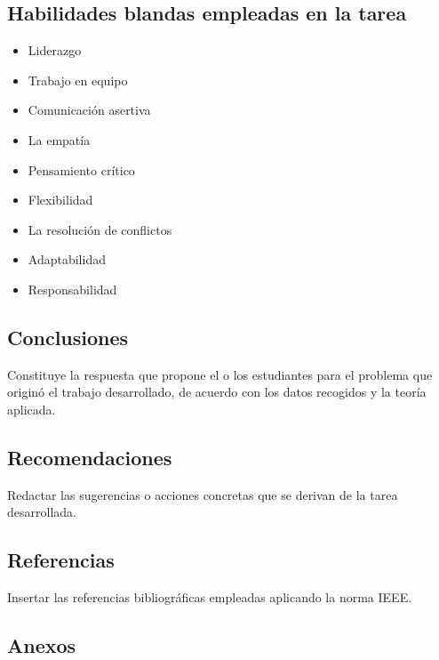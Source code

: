 \documentclass{article}
\begin{document}
\subsection{Habilidades blandas empleadas en la tarea}
\begin{itemize}
    \item[$\square$] Liderazgo
    \item[$\square$] Trabajo en equipo
    \item[$\square$] Comunicación asertiva
    \item[$\square$] La empatía
    \item[$\square$] Pensamiento crítico
    \item[$\square$] Flexibilidad
    \item[$\square$] La resolución de conflictos
    \item[$\square$] Adaptabilidad
    \item[$\square$] Responsabilidad
\end{itemize}


\subsection{Conclusiones}
Constituye la respuesta que propone el o los estudiantes para el problema que originó el trabajo desarrollado, de acuerdo con los datos recogidos y la teoría aplicada. 

\subsection{Recomendaciones}
Redactar las sugerencias o acciones concretas que se derivan de la tarea desarrollada. \cite{greenwade93}


\subsection{Referencias}
Insertar las referencias bibliográficas empleadas aplicando la norma IEEE.

\vspace{-3em} %
\renewcommand{\refname}{}



\subsection{Anexos}
\vfill
\end{document}
